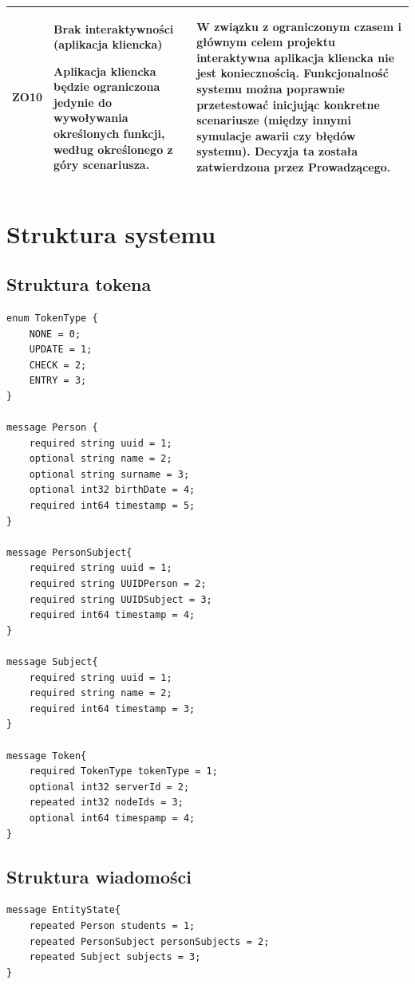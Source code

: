 {\begin{tabularx}{\textwidth}{|c|X|X|}
\label{z:ZO10} ZO10 &  \textbf{Brak interaktywności (aplikacja kliencka)}

Aplikacja kliencka będzie ograniczona jedynie do wywoływania określonych funkcji, według określonego z góry scenariusza. & 
W związku z ograniczonym czasem i głównym celem projektu interaktywna aplikacja kliencka nie jest koniecznością. Funkcjonalność systemu można poprawnie przetestować inicjując konkretne scenariusze (między innymi symulacje awarii czy błędów systemu). Decyzja ta została zatwierdzona przez Prowadzącego.\\
\hline

\end{tabularx}

\section[Struktura systemu]{Struktura systemu}

\subsection{Struktura tokena}
\begin{lstlisting}
enum TokenType {
    NONE = 0;
    UPDATE = 1;
    CHECK = 2;
    ENTRY = 3;
}

message Person {
    required string uuid = 1;
    optional string name = 2;
    optional string surname = 3;
    optional int32 birthDate = 4;
    required int64 timestamp = 5;
}

message PersonSubject{
    required string uuid = 1;
    required string UUIDPerson = 2;
    required string UUIDSubject = 3;
    required int64 timestamp = 4;
}

message Subject{
    required string uuid = 1;
	required string name = 2;
	required int64 timestamp = 3;
}

message Token{
    required TokenType tokenType = 1;
    optional int32 serverId = 2;
    repeated int32 nodeIds = 3;
    optional int64 timespamp = 4;
}
\end{lstlisting}

\subsection[Struktura wiadomości]{Struktura wiadomości}
\begin{lstlisting}
message EntityState{
    repeated Person students = 1;
    repeated PersonSubject personSubjects = 2;
    repeated Subject subjects = 3;
}


\end{lstlisting}}
